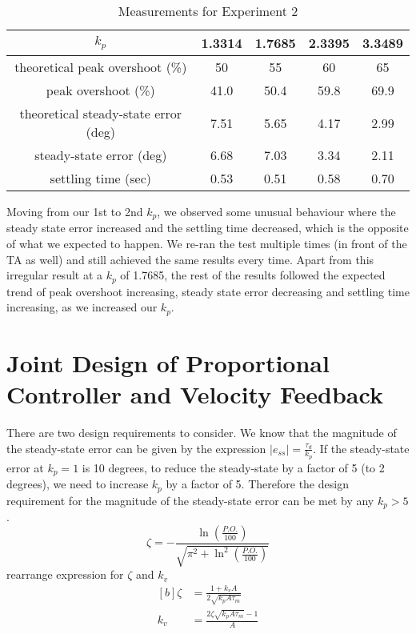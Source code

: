 \documentclass[12pt]{article}
\begin{document}

\begin{table}[h!]
\centering
\begin{tabular}{|c|c|c|c|c|} \hline
    $k_p$ & 1.3314 & 1.7685 & 2.3395 & 3.3489 \\ \hline
    theoretical peak overshoot (\%) & 50 & 55 & 60 & 65 \\ \hline
    peak overshoot (\%) & 41.0 & 50.4 & 59.8 & 69.9 \\ \hline
    theoretical steady-state error (deg) & 7.51 & 5.65 & 4.17 & 2.99 \\ \hline
    steady-state error (deg) & 6.68 & 7.03 & 3.34 & 2.11 \\ \hline
    settling time (sec) & 0.53 & 0.51 & 0.58 & 0.70 \\ \hline 
\end{tabular}
\caption{\label{table:exp2_measurements}Measurements for Experiment 2}
\end{table}

Moving from our 1st to 2nd $k_p$, we observed some unusual behaviour where the steady state error increased and the settling time decreased, which is the opposite of what we expected to happen. We re-ran the test multiple times (in front of the TA as well) and still achieved the same results every time. Apart from this irregular result at a $k_p$ of 1.7685, the rest of the results followed the expected trend of peak overshoot increasing, steady state error decreasing and settling time increasing, as we increased our $k_p$.
\setcounter{section}{5}
\section{Joint Design of Proportional Controller and Velocity Feedback}
There are two design requirements to consider. We know that the magnitude of the steady-state error can be given by the expression $\left| e_{ss} \right| = \frac{\tau_d}{k_p}$. If the steady-state error at $k_p = 1$ is 10 degrees, to reduce the steady-state by a factor of 5 (to 2 degrees), we need to increase $k_p$ by a factor of 5. Therefore the design requirement for the magnitude of the steady-state error can be met by any $k_p > 5$. 
\begin{equation}
    \zeta = -\frac{\ln\left(\frac{P.O.}{100}\right)}{\sqrt{\pi^2 + \ln^2\left(\frac{P.O.}{100}\right)}}
\end{equation}
rearrange expression for $\zeta$ and $k_v$
\begin{equation}
\begin{aligned}[b]
    \zeta &= \frac{1+k_vA}{2\sqrt{k_pA\tau_m}} \\
    k_v &= \frac{2\zeta\sqrt{k_pA\tau_m}-1}{A} 
\end{aligned}
\end{equation}


\end{document}
